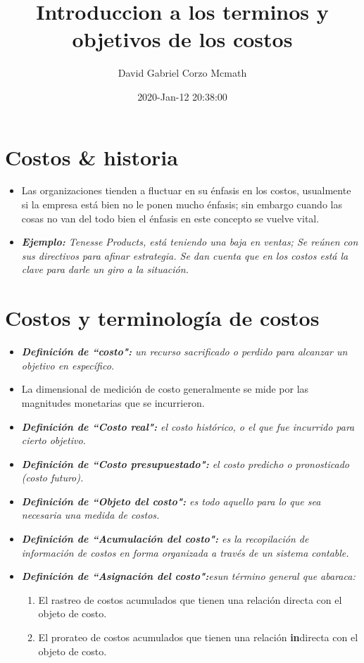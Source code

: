 \documentclass{article}
\title{Introduccion a los terminos y objetivos de los costos}
\author{David Gabriel Corzo Mcmath}
\date{2020-Jan-12 20:38:00}
\begin{document}
\maketitle

\section{Costos \& historia}
\begin{itemize}
    \item Las organizaciones tienden a fluctuar en su énfasis en los costos, usualmente si la empresa está bien no le ponen mucho énfasis; sin embargo cuando las cosas no van del todo bien el énfasis en este concepto se vuelve vital.
    \item \emph{\textbf{Ejemplo: } Tenesse Products, está teniendo una baja en ventas; Se reúnen con sus directivos para afinar estrategia. Se dan cuenta que en los costos está la clave para darle un giro a la situación.}
\end{itemize}

\section{Costos y terminología de costos}
\begin{itemize}
    \item \emph{\textbf{Definición de ``costo":} un recurso sacrificado o perdido para alcanzar un objetivo en específico.}
    \item La dimensional de medición de costo generalmente se mide por las magnitudes monetarias que se incurrieron.
    \item \emph{\textbf{Definición de ``Costo real":} el costo histórico, o el que fue incurrido para cierto objetivo.}
    \item \emph{\textbf{Definición de ``Costo presupuestado":} el costo predicho o pronosticado (costo futuro).}
    \item \emph{\textbf{Definición de ``Objeto del costo":} es todo aquello para lo que sea necesaria una medida de costos.}
    \item \emph{\textbf{Definición de ``Acumulación del costo":} es la recopilación de información de costos en forma organizada a través de un sistema contable.}
    \item \emph{\textbf{Definición de ``Asignación del costo":}esun término general que abaraca: }
        \begin{enumerate}
            \item El rastreo de costos acumulados que tienen una relación directa con el objeto de costo.
            \item El prorateo de costos acumulados que tienen una relación \textbf{in}directa con el objeto de costo.
        \end{enumerate}
\end{itemize}
\end{document}
